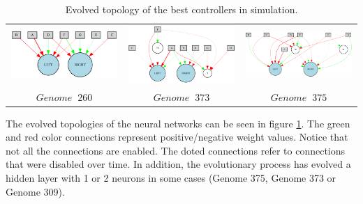 \begin{table}[h]
\begin{tabular}{ccc}
\includegraphics[scale=0.4]{include/images/sim_network_4.PNG} & \includegraphics[scale=0.4]{include/images/sim_network_5.PNG} & \includegraphics[scale=0.4]{include/images/sim_network_6.PNG} \\
$Genome \;  \; 260$  & $Genome \;  \; 373$  & $Genome \;  \; 375$  \\
\end{tabular}
\caption{Evolved topology of the best controllers in simulation.}
\label{fig:sim_network_topologies} %
\end{table}

The evolved topologies of the neural networks can be seen in figure \ref{fig:sim_network_topologies}. The green and red color connections represent positive/negative weight values. Notice that not all the connections are enabled. The doted connections refer to connections that were disabled over time. In addition, the evolutionary process has evolved a hidden layer with 1 or 2 neurons in some cases (Genome 375, Genome 373 or Genome 309).

